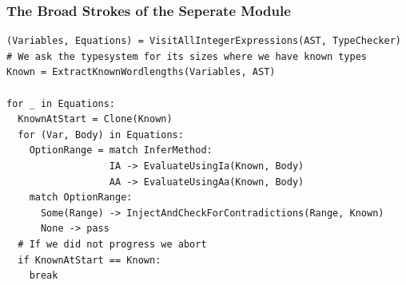 \documentclass{beamer}
\begin{document}
\begin{frame}[containsverbatim]
\footnotesize
\frametitle{The Broad Strokes of the Seperate Module}
\begin{verbatim}
(Variables, Equations) = VisitAllIntegerExpressions(AST, TypeChecker)
# We ask the typesystem for its sizes where we have known types
Known = ExtractKnownWordlengths(Variables, AST)

for _ in Equations:
  KnownAtStart = Clone(Known)
  for (Var, Body) in Equations:
    OptionRange = match InferMethod:
                  IA -> EvaluateUsingIa(Known, Body)
                  AA -> EvaluateUsingAa(Known, Body)
    match OptionRange:
      Some(Range) -> InjectAndCheckForContradictions(Range, Known)
      None -> pass
  # If we did not progress we abort
  if KnownAtStart == Known:
    break
\end{verbatim}
\end{frame}
\end{document}
